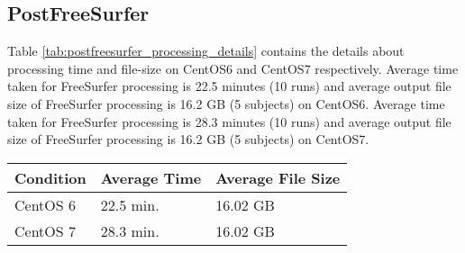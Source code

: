 

\subsection{PostFreeSurfer}
Table \ref{tab:postfreesurfer_processing_details} contains the details about processing time and file-size on CentOS6 and CentOS7 respectively.
Average time taken for FreeSurfer processing is 22.5 minutes (10 runs) and average output file size of FreeSurfer processing is 16.2 GB (5 subjects) on CentOS6.
Average time taken for FreeSurfer processing is 28.3 minutes (10 runs) and average output file size of FreeSurfer processing is 16.2 GB (5 subjects) on CentOS7.

\begin{center}
\begin{tabular}{ | l | l | l | }
  \hline
    \textbf{Condition} & \textbf{Average Time} & \textbf{Average File Size} \\
  \hline
    CentOS 6 & 22.5 min. & 16.02 GB \\
  \hline
    CentOS 7 & 28.3 min. & 16.02 GB \\
  \hline
\end{tabular}
\label{tab:postfreesurfer_processing_details}
\end{center}


